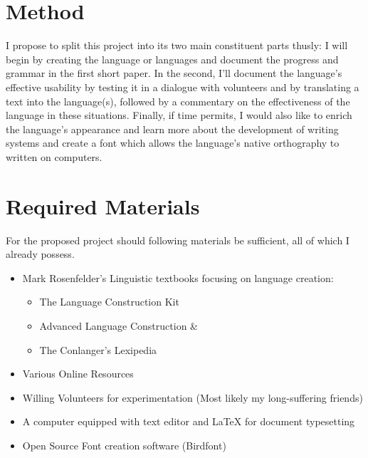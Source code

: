 \documentclass[a4paper,10pt]{article}
\begin{document}
\section{Method}
I propose to split this project into its two main constituent parts thusly:
I will begin by creating the language or languages and document the progress and grammar in
the first short paper. In the second, I'll document the language's effective usability by
testing it in a dialogue with volunteers and by translating a text into the language(s),
followed by a commentary on the effectiveness of the language in these situations.
Finally, if time permits, I would also like to enrich the language's appearance and learn
more about the development of writing systems and create a font which allows the language's
native orthography to written on computers.

\section{Required Materials}
For the proposed project should following materials be sufficient, all of which I already possess.
\begin{itemize}
    \item Mark Rosenfelder's Linguistic textbooks focusing on language creation:
    \begin{itemize}
        \item The Language Construction Kit
        \item Advanced Language Construction \&
        \item The Conlanger's Lexipedia
    \end{itemize}
    \item Various Online Resources
    \item Willing Volunteers for experimentation (Most likely my long-suffering friends)
    \item A computer equipped with text editor and \LaTeX \hspace{0.5mm} for document typesetting
    \item Open Source Font creation software (Birdfont)
\end{itemize}
\end{document}
